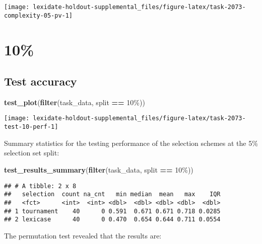 \documentclass[
]{book}
\newenvironment{Shaded}{\begin{snugshade}}{\end{snugshade}}
\newcommand{\FunctionTok}[1]{\textcolor[rgb]{0.13,0.29,0.53}{\textbf{#1}}}
\newcommand{\NormalTok}[1]{#1}
\newcommand{\SpecialCharTok}[1]{\textcolor[rgb]{0.81,0.36,0.00}{\textbf{#1}}}
\newcommand{\StringTok}[1]{\textcolor[rgb]{0.31,0.60,0.02}{#1}}
\begin{document}
\texttt{[image: lexidate-holdout-supplemental\_files/figure-latex/task-2073-complexity-05-pv-1]}

\hypertarget{section-41}{%
\section{10\%}\label{section-41}}

\hypertarget{test-accuracy-41}{%
\subsection{Test accuracy}\label{test-accuracy-41}}

\begin{Shaded}
\begin{Highlighting}[]
\FunctionTok{test\_plot}\NormalTok{(}\FunctionTok{filter}\NormalTok{(task\_data, split }\SpecialCharTok{==} \StringTok{\textquotesingle{}10\%\textquotesingle{}}\NormalTok{))}
\end{Highlighting}
\end{Shaded}

\texttt{[image: lexidate-holdout-supplemental\_files/figure-latex/task-2073-test-10-perf-1]}

Summary statistics for the testing performance of the selection schemes at the 5\% selection set split:

\begin{Shaded}
\begin{Highlighting}[]
\FunctionTok{test\_results\_summary}\NormalTok{(}\FunctionTok{filter}\NormalTok{(task\_data, split }\SpecialCharTok{==} \StringTok{\textquotesingle{}10\%\textquotesingle{}}\NormalTok{))}
\end{Highlighting}
\end{Shaded}

\begin{verbatim}
## # A tibble: 2 x 8
##   selection  count na_cnt   min median  mean   max    IQR
##   <fct>      <int>  <int> <dbl>  <dbl> <dbl> <dbl>  <dbl>
## 1 tournament    40      0 0.591  0.671 0.671 0.718 0.0285
## 2 lexicase      40      0 0.470  0.654 0.644 0.711 0.0554
\end{verbatim}

The permutation test revealed that the results are:
\end{document}

